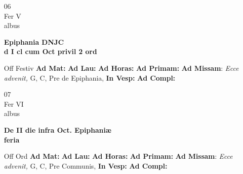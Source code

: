 \documentclass[10pt, openany]{book}
\begin{document}
        \begin{center}
            \begin{minipage}{3.5in}
                \vspace{2em}
                \begin{minipage}{0.5in}
                    {\Huge 06} \\
                    {\normalsize Fer V} \\
                    {\normalsize albus}
                \end{minipage}
                \begin{minipage}{3.0in}
                    \textbf{ \large Epiphania DNJC \\
                    \textnormal{\normalsize d I cl cum Oct privil 2 ord}} \\ 
                \end{minipage}
                \begin{justify}Off Festiv
                    \textbf{Ad Mat: }
                    \textbf{Ad Lau: }
                    \textbf{Ad Horas: }
                    \textbf{Ad Primam: }\textbf{Ad Missam}: \textit{Ecce advenit,} G, C, Pre de Epiphania,  
                    \textbf{In Vesp: }
                    \textbf{Ad Compl: }
                \end{justify}
            \end{minipage}
        \end{center}
    
        \begin{center}
            \begin{minipage}{3.5in}
                \vspace{2em}
                \begin{minipage}{0.5in}
                    {\Huge 07} \\
                    {\normalsize Fer VI} \\
                    {\normalsize albus}
                \end{minipage}
                \begin{minipage}{3.0in}
                    \textbf{ \large De II die infra Oct. Epiphaniæ \\
                    \textnormal{\normalsize feria}} \\ 
                \end{minipage}
                \begin{justify}Off Ord
                    \textbf{Ad Mat: }
                    \textbf{Ad Lau: }
                    \textbf{Ad Horas: }
                    \textbf{Ad Primam: }\textbf{Ad Missam}: \textit{Ecce advenit,} G, C, Pre Communis,  
                    \textbf{In Vesp: }
                    \textbf{Ad Compl: }
                \end{justify}
            \end{minipage}
        \end{center}
    
\end{document}

